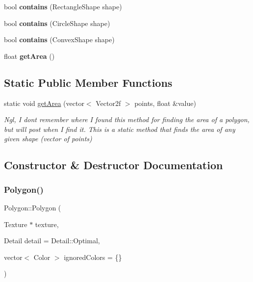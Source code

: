 \begin{DoxyCompactItemize}
\item 
\mbox{\label{class_polygon_a1712cd82ff38472dd9ba87f0f8b37a9f}} 
bool {\bfseries contains} (Rectangle\+Shape shape)
\item 
\mbox{\label{class_polygon_a60fe86ef61eeb9903a8eef32870ea1c4}} 
bool {\bfseries contains} (Circle\+Shape shape)
\item 
\mbox{\label{class_polygon_aea5d69a1006a0b6b08dbc3e236b302ea}} 
bool {\bfseries contains} (Convex\+Shape shape)
\item 
\mbox{\label{class_polygon_a00dc79655e7be6b73a83414a6733ec9a}} 
float {\bfseries get\+Area} ()
\end{DoxyCompactItemize}
\subsection*{Static Public Member Functions}
\begin{DoxyCompactItemize}
\item 
static void \mbox{\hyperlink{class_polygon_a21a607cdb559f8e4a98fa54d0b9d63a9}{get\+Area}} (vector$<$ Vector2f $>$ points, float \&value)
\begin{DoxyCompactList}\small\item\em Ngl, I don\textquotesingle{}t remember where I found this method for finding the area of a polygon, but will post when I find it. This is a static method that finds the area of any given shape (vector of points) \end{DoxyCompactList}\end{DoxyCompactItemize}


\subsection{Constructor \& Destructor Documentation}
\mbox{\label{class_polygon_a55f28f7bcae8df65ea11b99ff192b7d7}} 
\subsubsection{\texorpdfstring{Polygon()}{Polygon()}}
{\footnotesize\ttfamily Polygon\+::\+Polygon (\begin{DoxyParamCaption}\item[{Texture $\ast$}]{texture,  }\item[{Detail}]{detail = {\ttfamily Detail\+:\+:Optimal},  }\item[{vector$<$ Color $>$}]{ignored\+Colors = {\ttfamily \{\}} }\end{DoxyParamCaption})}


